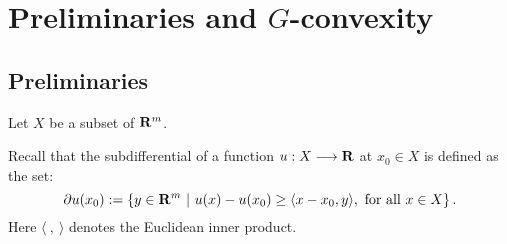 \chapter{Preliminaries and $G$-convexity}\label{chapter:preliminaries}

\section{Preliminaries}


Let $X$ be a subset of ${\mathbf R}^m$. %
\medskip




\begin{definition}[Subdifferential]
	Recall that the subdifferential of a function $u: X \longrightarrow {\mathbf R}$ at $x_0 \in X$ is defined as the set:
	\begin{equation}\label{defn:subdifferential}
	\partial u(x_0) := \left\{ y \in {\mathbf R}^m~|~ u(x) - u(x_0) \ge \langle  x- x_0,  y \rangle, \text{ for all } x \in X  \right\}.
	\end{equation}
	Here  $ \langle\ ,\ \rangle$ denotes the Euclidean inner product. 
\end{definition}

